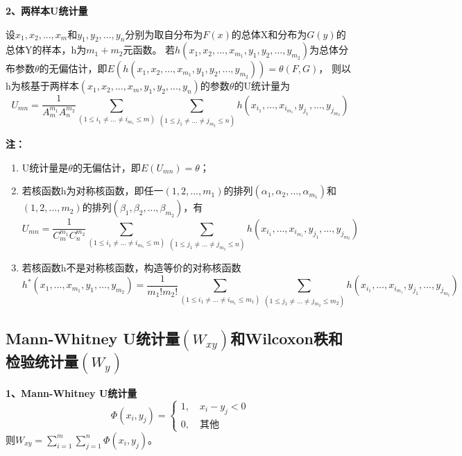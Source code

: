 \documentclass[lang=cn,10pt]{elegantbook}
\begin{document}
\textbf{2、两样本U统计量}
\begin{definition}
    设$x_1,x_2,...,x_m$和$y_1,y_2,...,y_n$分别为取自分布为$F(x)$的总体X和分布为$G(y)$的总体Y的样本，h为$m_1+m_2$元函数。
    若$h(x_1,x_2,...,x_{m_1},y_1,y_2,...,y_{m_2})$为总体分布参数$\theta$的无偏估计，即$E(h(x_1,x_2,...,x_{m_1},y_1,y_2,...,y_{m_2}))=\theta(F,G)$，
    则以h为核基于两样本$(x_1,x_2,...,x_m,y_1,y_2,...,y_n)$的参数$\theta$的U统计量为
    \begin{equation}
        U_{mn} = \frac1{A_m^{m_1}A_n^{{m}_2}}\sum_{(1\leq i_1\neq\ldots\neq i_{m_1}\leq m)}\sum_{(1\leq j_1\neq\ldots\neq j_{m_2}\leq n)}h(x_{i_1},\ldots,x_{i_{m_1}},y_{j_1},\ldots,y_{j_{m_2}})
    \end{equation}
\end{definition}
\textbf{注：}
\begin{enumerate}
    \item U统计量是$\theta$的无偏估计，即$E(U_{mn}) = \theta$；
    \item 若核函数h为对称核函数，即任一$(1,2,...,m_1)$的排列$(\alpha_{1},\alpha_{2},...,\alpha_{m_1})$和$(1,2,...,m_2)$的排列$(\beta_{1},\beta_{2},...,\beta_{m_2})$，有
    \begin{equation}
        U_{mn} = \frac1{C_m^{m_1}C_n^{{m}_2}}\sum_{(1\leq i_1\neq\ldots\neq i_{m_1}\leq m)}\sum_{(1\leq j_1\neq\ldots\neq j_{m_2}\leq n)}h(x_{i_1},\ldots,x_{i_{m_1}},y_{j_1},\ldots,y_{j_{m_2}})
    \end{equation}
    \item 若核函数h不是对称核函数，构造等价的对称核函数
    \begin{equation}
        h^*(x_1,\ldots,x_{m_1},y_1,\ldots,y_{m_2})=\frac1{m_1!m_2!}\sum_{(1\leq i_1\neq\ldots\neq i_{m_1}\leq m_1)}\sum_{(1\leq j_1\neq\ldots\neq j_{m_2}\leq m_2)}h(x_{i_1},\ldots,x_{i_{m_1}},y_{j_1},\ldots,y_{j_{m_2}})
    \end{equation}
\end{enumerate}

\subsection{Mann-Whitney U统计量$(W_{xy})$和Wilcoxon秩和检验统计量$(W_y)$}

\textbf{1、Mann-Whitney U统计量}
\begin{equation}
    \Phi(x_{i},y_{j})=\begin{cases}{1,\quad x_{i}-y_{j}<0}\\{0,\quad\text{其他}}\end{cases}
\end{equation}
则$W_{xy} = \sum_{i = 1}^m\sum_{j = 1}^n \Phi(x_i,y_j)$。
\end{document}
